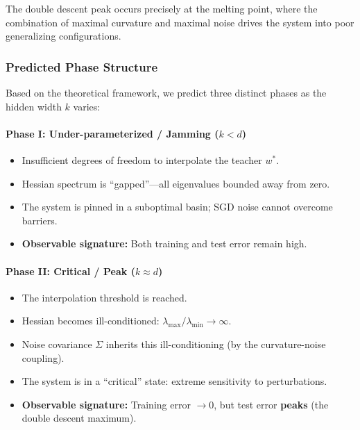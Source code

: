 \documentclass[
  journal=largetwo,
  year=2025,
  volume=37,
]{cup-journal}
\begin{document}
The double descent peak occurs precisely at the melting point, where the combination of maximal curvature and maximal noise drives the system into poor generalizing configurations.

\subsubsection{Predicted Phase Structure}

Based on the theoretical framework, we predict three distinct phases as the hidden width $k$ varies:

\paragraph{Phase I: Under-parameterized / Jamming ($k < d$)}
\begin{itemize}
    \item Insufficient degrees of freedom to interpolate the teacher $w^*$.
    \item Hessian spectrum is ``gapped''---all eigenvalues bounded away from zero.
    \item The system is pinned in a suboptimal basin; SGD noise cannot overcome barriers.
    \item \textbf{Observable signature:} Both training and test error remain high.
\end{itemize}

\paragraph{Phase II: Critical / Peak ($k \approx d$)}
\begin{itemize}
    \item The interpolation threshold is reached.
    \item Hessian becomes ill-conditioned: $\lambda_{\max}/\lambda_{\min} \to \infty$.
    \item Noise covariance $\Sigma$ inherits this ill-conditioning (by the curvature-noise coupling).
    \item The system is in a ``critical'' state: extreme sensitivity to perturbations.
    \item \textbf{Observable signature:} Training error $\to 0$, but test error \textbf{peaks} (the double descent maximum).
\end{itemize}
\end{document}
